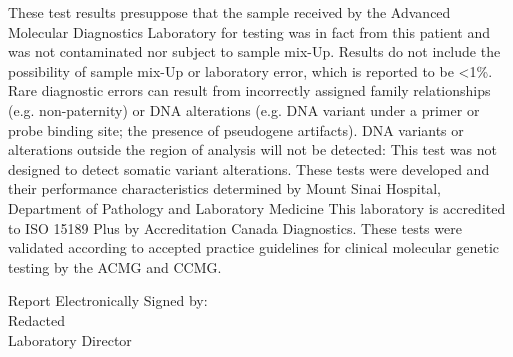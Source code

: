 \documentclass[10pt]{extarticle}
\begin{document}
These test results presuppose that the sample received by the Advanced Molecular Diagnostics Laboratory for testing was in fact from this patient and was not contaminated nor subject to sample mix-Up. Results do not include the possibility of sample mix-Up or laboratory error, which is reported to be <1\%. Rare diagnostic errors can result from incorrectly assigned family relationships (e.g. non-paternity) or DNA alterations (e.g. DNA variant under a primer or probe binding site; the presence of pseudogene artifacts). DNA variants or alterations outside the region of analysis will not be detected: This test was not designed to detect somatic variant alterations. These tests were developed and their performance characteristics determined by Mount Sinai Hospital, Department of Pathology and Laboratory Medicine This laboratory is accredited to ISO 15189 Plus by Accreditation Canada Diagnostics. These tests were validated according to accepted practice guidelines for clinical molecular genetic testing by the ACMG and CCMG.

\vspace{2em}
\hfill \parbox{10cm}{
Report Electronically Signed by: \\
Redacted \\
Laboratory Director
}
\end{document}
